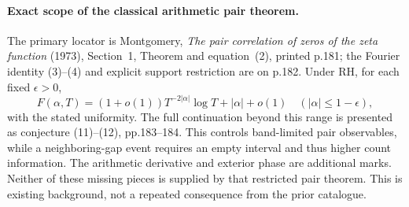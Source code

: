 \paragraph{Exact scope of the classical arithmetic pair theorem.}
The primary locator is Montgomery, \emph{The pair correlation of zeros
of the zeta function} (1973), Section~1, Theorem and equation~(2),
printed p.181; the Fourier identity (3)--(4) and explicit support
restriction are on p.182. Under RH, for each fixed $\epsilon>0$,
\[
 F(\alpha,T)=(1+o(1))T^{-2|\alpha|}\log T+|\alpha|+o(1)
 \quad (|\alpha|\le1-\epsilon),
\]
with the stated uniformity. The full continuation beyond this range
is presented as conjecture (11)--(12), pp.183--184. This controls
band-limited pair observables, while a neighboring-gap event requires
an empty interval and thus higher count information. The arithmetic
derivative and exterior phase are additional marks. Neither of these
missing pieces is supplied by that restricted pair theorem. This is
existing background, not a repeated consequence from the prior catalogue.
